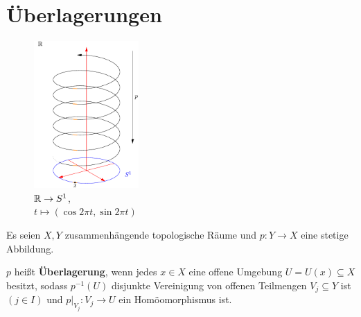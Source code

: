 \section{Überlagerungen}
\begin{figure}
    \centering
    \includegraphics[width=4cm, keepaspectratio]{figures/topology-r-spiral-covering-s.pdf}
    \caption{$\mathbb{R} \rightarrow S^1$,\\$t \mapsto (\cos 2 \pi t, \sin 2 \pi t)$}
    \label{fig:ueberlappung-r1-spirale-s1}
\end{figure}
\begin{definition}\label{def:12.1}%
    Es seien $X, Y$ zusammenhängende topologische Räume und
    $p: Y \rightarrow X$ eine stetige Abbildung.

    $p$ heißt \textbf{Überlagerung}, wenn jedes $x \in X$ eine offene
    Umgebung $U = U(x) \subseteq X$ besitzt, sodass $p^{-1}(U)$ disjunkte Vereinigung
    von offenen Teilmengen $V_j \subseteq Y$ ist $(j \in I)$ und
    $p|_{V_j}: V_j \rightarrow U$ ein Homöomorphismus ist.
\end{definition}

